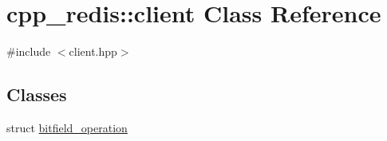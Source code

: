 \hypertarget{classcpp__redis_1_1client}{}\section{cpp\+\_\+redis\+:\+:client Class Reference}
\label{classcpp__redis_1_1client}


{\ttfamily \#include $<$client.\+hpp$>$}

\subsection*{Classes}
\begin{DoxyCompactItemize}
\item 
struct \mbox{\hyperlink{structcpp__redis_1_1client_1_1bitfield__operation}{bitfield\+\_\+operation}}
\end{DoxyCompactItemize}
